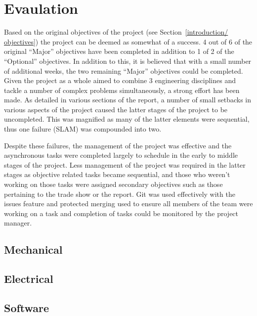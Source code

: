 
\chapter{Evaulation}\label{eval}
Based on the original objectives of the project (see Section~\ref{introduction/
objectives}) the project can be deemed as somewhat of a success. 4 out of 6 of 
the original ``Major'' objectives have been completed in addition to 1 of 2 of 
the ``Optional'' objectives. In addition to this, it is believed that with a 
small number of additional weeks, the two remaining ``Major'' objectives could 
be completed. Given the project as a whole aimed to combine 3 engineering 
disciplines and tackle a number of complex problems simultaneously, a strong 
effort  has been made. 
As detailed in various sections of the report, a number of small setbacks in 
various aspects of the project caused the latter stages of the project to be 
uncompleted. This was magnified as many of the latter elements were sequential, 
thus one failure (SLAM) was compounded into two. 

Despite these failures, the management of the project was effective and the 
asynchronous tasks were completed largely to schedule in the early to middle 
stages of the project. Less management of the project was required in the latter 
stages as objective related tasks became sequential, and those who weren't 
working on those tasks were assigned secondary objectives such as those 
pertaining to the trade show or the report. Git was used effectively with the 
issues feature and protected merging used to ensure all members of the team were 
working on a task and completion of tasks could be monitored by the project 
manager. 

\section{Mechanical}\label{eval/mech}


\section{Electrical}\label{eval/elec}


\section{Software}\label{eval/soft}
